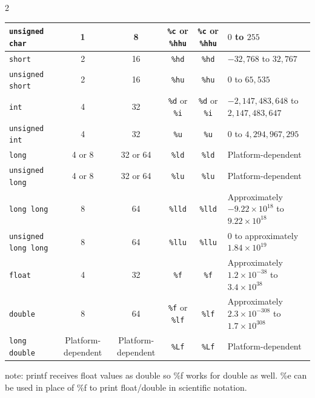 \documentclass[10pt, portrait]{article}
\begin{document}
\begin{multicols*}{2}
\begin{center}
{\begin{tabular}{|l|c|c|c|c|l|}
\texttt{unsigned char}
& 1
& 8
& \texttt{\%c} or \texttt{\%hhu}
& \texttt{\%c} or \texttt{\%hhu}
& $0$ to $255$
\\ \hline

\texttt{short}
& 2
& 16
& \texttt{\%hd}
& \texttt{\%hd}
& $-32{,}768$ to $32{,}767$
\\ \hline

\texttt{unsigned short}
& 2
& 16
& \texttt{\%hu}
& \texttt{\%hu}
& $0$ to $65{,}535$
\\ \hline

\texttt{int}
& 4
& 32
& \texttt{\%d} or \texttt{\%i}
& \texttt{\%d} or \texttt{\%i}
& $-2{,}147{,}483{,}648$ to $2{,}147{,}483{,}647$
\\ \hline

\texttt{unsigned int}
& 4
& 32
& \texttt{\%u}
& \texttt{\%u}
& $0$ to $4{,}294{,}967{,}295$
\\ \hline

\texttt{long}
& 4 or 8
& 32 or 64
& \texttt{\%ld}
& \texttt{\%ld}
& Platform-dependent
\\ \hline

\texttt{unsigned long}
& 4 or 8
& 32 or 64
& \texttt{\%lu}
& \texttt{\%lu}
& Platform-dependent
\\ \hline

\texttt{long long}
& 8
& 64
& \texttt{\%lld}
& \texttt{\%lld}
& Approximately $-9.22 \times 10^{18}$ to $9.22 \times 10^{18}$
\\ \hline

\texttt{unsigned long long}
& 8
& 64
& \texttt{\%llu}
& \texttt{\%llu}
& $0$ to approximately $1.84 \times 10^{19}$
\\ \hline

\texttt{float}
& 4
& 32
& \texttt{\%f}
& \texttt{\%f}
& Approximately $1.2 \times 10^{-38}$ to $3.4 \times 10^{38}$
\\ \hline

\texttt{double}
& 8
& 64
& \texttt{\%f} or \texttt{\%lf}
& \texttt{\%lf}
& Approximately $2.3 \times 10^{-308}$ to $1.7 \times 10^{308}$
\\ \hline

\texttt{long double}
& Platform-dependent
& Platform-dependent
& \texttt{\%Lf}
& \texttt{\%Lf}
& Platform-dependent
\\ \hline

\end{tabular}%
}
\end{center}
note: printf receives float values as double so \%f works for double as well. \%e can be used in place of \%f to print float/double in scientific notation. 


\end{multicols*}
\end{document}
